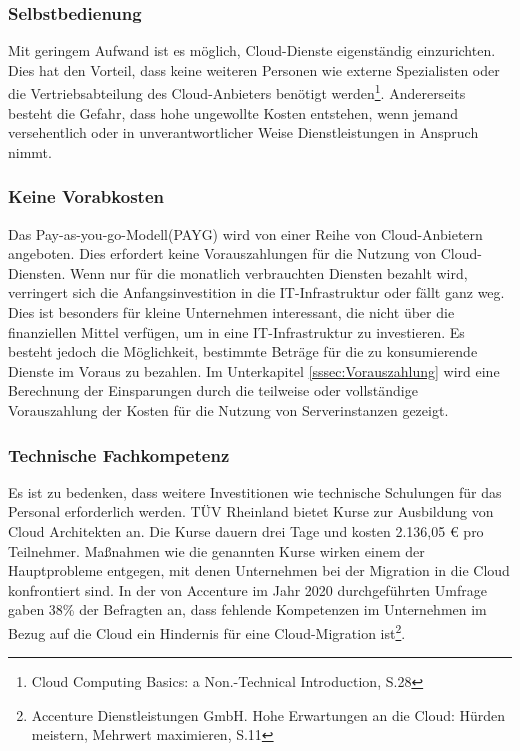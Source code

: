 \subsubsection{Selbstbedienung}
Mit geringem Aufwand ist es möglich, Cloud-Dienste eigenständig einzurichten. Dies hat den Vorteil, dass keine weiteren Personen wie externe Spezialisten oder die Vertriebsabteilung des Cloud-Anbieters  benötigt werden\footnote{Cloud Computing Basics: a Non.-Technical Introduction, S.28\cite{CCB}}.
Andererseits besteht die Gefahr, dass hohe ungewollte Kosten entstehen, wenn jemand versehentlich oder in unverantwortlicher Weise Dienstleistungen in Anspruch nimmt.    

\subsubsection{Keine Vorabkosten}
Das Pay-as-you-go-Modell(PAYG) wird von einer Reihe von Cloud-Anbietern angeboten. Dies erfordert keine Vorauszahlungen für die Nutzung von Cloud-Diensten. Wenn nur für die monatlich verbrauchten Diensten bezahlt wird, verringert sich die Anfangsinvestition in die IT-Infrastruktur oder fällt ganz weg. Dies ist besonders für kleine Unternehmen interessant, die nicht über die finanziellen Mittel verfügen, um in eine IT-Infrastruktur zu investieren. Es besteht jedoch die Möglichkeit, bestimmte Beträge für die zu konsumierende Dienste im Voraus zu bezahlen. Im Unterkapitel \ref{sssec:Vorauszahlung} wird eine Berechnung der Einsparungen durch die teilweise oder vollständige Vorauszahlung der Kosten für die Nutzung von Serverinstanzen gezeigt.  




\subsubsection{Technische Fachkompetenz}
Es ist zu bedenken, dass weitere Investitionen wie technische Schulungen für das Personal erforderlich werden. TÜV Rheinland bietet Kurse zur Ausbildung von Cloud Architekten an. Die Kurse dauern drei Tage und kosten 2.136,05 € pro Teilnehmer. Maßnahmen wie die genannten Kurse wirken einem der Hauptprobleme entgegen, mit denen Unternehmen bei der Migration in die Cloud konfrontiert sind. In der von Accenture im Jahr 2020 durchgeführten Umfrage gaben 38\% der Befragten an, dass fehlende Kompetenzen im Unternehmen im Bezug auf die Cloud ein Hindernis für eine Cloud-Migration ist\footnote{Accenture Dienstleistungen GmbH. Hohe Erwartungen an die Cloud: Hürden
meistern, Mehrwert maximieren, S.11\cite{ACC1}}.

